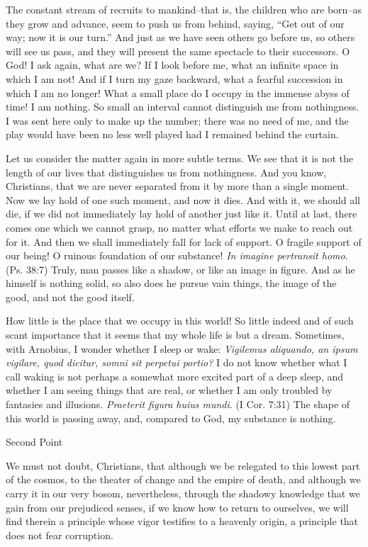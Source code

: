 \documentclass[10pt, twoside]{article}
\newcommand{\pointsection}[1]{%
  \par\vspace{1.5em}%
  {\centering\small #1\par}%
  \vspace{1em}%
}
\begin{document}
The constant stream of recruits to mankind--that is, the children who are born--as they grow and advance, seem to push us from behind, saying, ``Get out of our way; now it is our turn.'' And just as we have seen others go before us, so others will see us pass, and they will present the same spectacle to their successors. O God! I ask again, what are we? If I look before me, what an infinite space in which I am not! And if I turn my gaze backward, what a fearful succession in which I am no longer! What a small place do I occupy in the immense abyss of time! I am nothing. So small an interval cannot distinguish me from nothingness. I was sent here only to make up the number; there was no need of me, and the play would have been no less well played had I remained behind the curtain.

Let us consider the matter again in more subtle terms. We see that it is not the length of our lives that distinguishes us from nothingness. And you know, Christians, that we are never separated from it by more than a single moment. Now we lay hold of one such moment, and now it dies. And with it, we should all die, if we did not immediately lay hold of another just like it. Until at last, there comes one which we cannot grasp, no matter what efforts we make to reach out for it. And then we shall immediately fall for lack of support. O fragile support of our being! O ruinous foundation of our substance! \textit{In imagine pertransit homo}. (Ps. 38:7) Truly, man passes like a shadow, or like an image in figure. And as he himself is nothing solid, so also does he pursue vain things, the image of the good, and not the good itself.

How little is the place that we occupy in this world! So little indeed and of such scant importance that it seems that my whole life is but a dream. Sometimes, with Arnobius, I wonder whether I sleep or wake: \textit{Vigilemus aliquando, an ipsum vigilare, quod dicitur, somni sit perpetui portio?} I do not know whether what I call waking is not perhaps a somewhat more excited part of a deep sleep, and whether I am seeing things that are real, or whether I am only troubled by fantasies and illusions. \textit{Praeterit figura huius mundi}. (I Cor. 7:31) The shape of this world is passing away, and, compared to God, my substance is nothing.

\pointsection{Second Point}

We must not doubt, Christians, that although we be relegated to this lowest part of the cosmos, to the theater of change and the empire of death, and although we carry it in our very bosom, nevertheless, through the shadowy knowledge that we gain from our prejudiced senses, if we know how to return to ourselves, we will find therein a principle whose vigor testifies to a heavenly origin, a principle that does not fear corruption.
\end{document}
